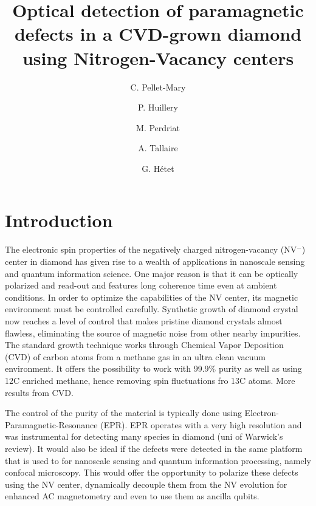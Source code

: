 \documentclass[9pt,twocolumn,twoside]{osajnl}
\title{Optical detection of paramagnetic defects in a CVD-grown diamond using Nitrogen-Vacancy centers}
\author[1]{C. Pellet-Mary}
\author[1]{P. Huillery}
\author[1]{M. Perdriat}
\author[2]{A. Tallaire}
\author[1]{G. H\'etet}
\affil[1]{Laboratoire de Physique de l'Ecole normale sup\'erieure, ENS, Universit\'e PSL, CNRS, Sorbonne Universit\'e, Universit\'e Paris-Diderot, Sorbonne Paris Cit\'e, Paris, France.}
\affil[*]{Corresponding author: gabriel.hetet@ens.fr}
\begin{document}
\maketitle

\section{Introduction}
The electronic spin properties of the negatively charged nitrogen-vacancy (NV$^-$) center in diamond has given rise to a wealth of applications in nanoscale sensing and quantum information science. One major reason is that it can be optically polarized and read-out and features long coherence time even at ambient conditions. 
In order to optimize the capabilities of the NV center, its magnetic environment must be controlled carefully. 
Synthetic growth of diamond crystal now reaches a level of control that makes pristine diamond crystals almost flawless, eliminating the source of magnetic noise from other nearby impurities. The standard growth technique works through Chemical Vapor Deposition (CVD) of carbon atoms from a methane gas in an ultra clean vacuum environment. It offers the possibility to work with 99.9\% purity as well as using 12C enriched methane, hence removing spin fluctuations fro 13C atoms. More results from CVD. 

The control of the purity of the material is typically done using Electron-Paramagnetic-Resonance (EPR). 
EPR operates with a very high resolution and was instrumental for detecting many species in diamond (uni of Warwick's review).
It would also be ideal if the defects were detected in the same platform that is used to for nanoscale sensing and quantum information processing, namely confocal microscopy. 
This would offer the opportunity to polarize these defects using the NV center, dynamically decouple them from the NV evolution for enhanced AC magnetometry and even to use them as ancilla qubits. 
\end{document}
